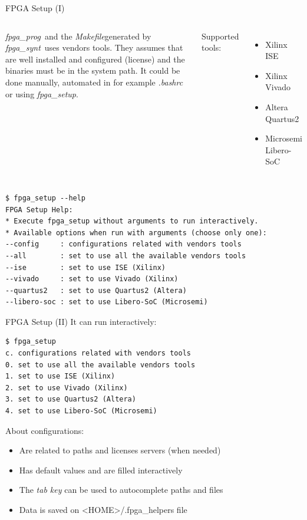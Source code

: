 \documentclass{beamer}
\newcommand{\fpgasetup}      {\textit{fpga\_setup}}
\newcommand{\fpgasynt}       {\textit{fpga\_synt}}
\newcommand{\fpgaprog}       {\textit{fpga\_prog}}
\newcommand{\makefile}       {\textit{Makefile}}
\begin{document}
\begin{frame}[fragile]{FPGA Setup (I)}
  \begin{columns}
      \begin{block}{}
        \small
        \fpgaprog\ and the \makefile generated by \fpgasynt\ uses vendors tools.
        They assumes that are well installed and configured (license) and the
        binaries must be in the system path. It could be done manually,
        automated in for example \textit{.bashrc} or using \fpgasetup.
      \end{block}{}
      \small Supported tools:
      \begin{itemize}
        \tiny
        \item Xilinx ISE
        \item Xilinx Vivado
        \item Altera Quartus2
        \item Microsemi Libero-SoC
      \end{itemize}
  \end{columns}
  \scriptsize
  \begin{verbatim}
$ fpga_setup --help
FPGA Setup Help:
* Execute fpga_setup without arguments to run interactively.
* Available options when run with arguments (choose only one):
--config     : configurations related with vendors tools
--all        : set to use all the available vendors tools
--ise        : set to use ISE (Xilinx)
--vivado     : set to use Vivado (Xilinx)
--quartus2   : set to use Quartus2 (Altera)
--libero-soc : set to use Libero-SoC (Microsemi)
  \end{verbatim}
\end{frame}

\begin{frame}[fragile]{FPGA Setup (II)}
  It can run interactively:
  \scriptsize
  \begin{verbatim}
$ fpga_setup
c. configurations related with vendors tools
0. set to use all the available vendors tools
1. set to use ISE (Xilinx)
2. set to use Vivado (Xilinx)
3. set to use Quartus2 (Altera)
4. set to use Libero-SoC (Microsemi)
  \end{verbatim}
  \normalsize
  About configurations:
  \begin{itemize}
    \item Are related to paths and licenses servers (when needed)
    \item Has default values and are filled interactively
    \item The \textit{tab key} can be used to autocomplete paths and files
    \item Data is saved on <HOME>/.fpga\_helpers file
  \end{itemize}
\end{frame}
\end{document}
